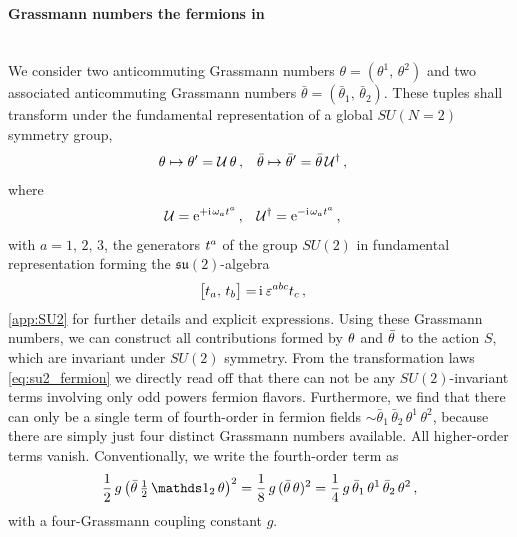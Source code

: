 \paragraph{Grassmann numbers \dash{} the fermions in \texorpdfstring{\dzero{}}{d=0}}\label{paragraph:0dSU2modelFermions}\mbox{}\\%
We consider two anticommuting Grassmann numbers $\theta = (\theta^1 ,\, \theta^2 )$ and two associated anticommuting Grassmann numbers $\bar{\theta} = (\bar{\theta}_1 ,\, \bar{\theta}_2)$.
These tuples shall transform under the fundamental representation of a global $SU(N = 2)$ symmetry group,
		\begin{align}
			&	\theta \mapsto \theta^\prime = \mathcal{U}{}\, \theta \, ,	&&	\bar{\theta} \mapsto \bar{\theta}^\prime = \bar{\theta}\, \mathcal{U}{}^{ \dagger} \, ,	\label{eq:su2_fermion}
		\end{align}
	where
		\begin{align}
			&	\suNU{} = \eu^{+ \iu \vts{} \omega_a  \suIItup{a} } \, ,	&&	\suNU{}^{\dagger} = \eu^{-\iu\vts{} \omega_a  \suIItup{a} } \, ,	\label{eq:su_2_rotations}
		\end{align}
	with $a = 1,\,2,\,3$, the generators $t^{a}$ of the group $SU(2)$ in fundamental representation forming the $\mathfrak{su}(2)$-algebra
		\begin{align}
			\big[ t_{a} ,\, t_{b} \big] =\, & \mathrm{i}\mkern1mu \, \varepsilon^{a b c}t_{c}  \, ,	\label{eq:su2_lie_algebra}
		\end{align}
	\cf{} \cref{app:SU2} for further details and explicit expressions.
Using these Grassmann numbers, we can construct all contributions formed by $\theta$ and $\bar{\theta}$ to the action $S$, which are invariant under $SU(2)$ symmetry.
From the transformation laws \eqref{eq:su2_fermion} we directly read off that there can not be any $SU(2)$-invariant terms involving only odd powers fermion flavors.
Furthermore, we find that there can only be a single term of fourth-order in fermion fields $\sim \bar{\theta}_1 \, \bar{\theta}_2 \, \theta^1 \, \theta^2$, because there are simply just four distinct Grassmann numbers available.
All higher-order terms vanish. 
Conventionally, we write the fourth-order term as
\begin{align}
	\frac{1}{2} \,g\, \big( \bar{\theta} \, \tfrac{1}{2} \, \Id_2 \, \theta \big)^2 = \frac{1}{8} \,g\, ( \bar{\theta} \, \theta )^2 = \frac{1}{4} \,g\, \bar{\theta}_1 \, \theta^1 \, \bar{\theta}_2 \, \theta^2 \, ,
\end{align}
with a four-Grassmann coupling constant $g$.

